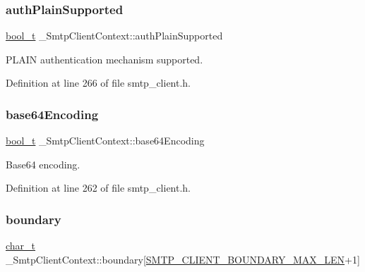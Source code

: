 \subsubsection{\texorpdfstring{auth\+Plain\+Supported}{authPlainSupported}}
{\footnotesize\ttfamily \hyperlink{compiler__port_8h_a812d16e5494522586b3784e55d479912}{bool\+\_\+t} \+\_\+\+Smtp\+Client\+Context\+::auth\+Plain\+Supported}



P\+L\+A\+IN authentication mechanism supported. 



Definition at line 266 of file smtp\+\_\+client.\+h.

\mbox{\label{struct__SmtpClientContext_a7805b71cff07e84b4592a21cfc830ac7}} 
\subsubsection{\texorpdfstring{base64\+Encoding}{base64Encoding}}
{\footnotesize\ttfamily \hyperlink{compiler__port_8h_a812d16e5494522586b3784e55d479912}{bool\+\_\+t} \+\_\+\+Smtp\+Client\+Context\+::base64\+Encoding}



Base64 encoding. 



Definition at line 262 of file smtp\+\_\+client.\+h.

\mbox{\label{struct__SmtpClientContext_ac5d4f45c1fbfc6f882f0d1bd99f5faa0}} 
\subsubsection{\texorpdfstring{boundary}{boundary}}
{\footnotesize\ttfamily \hyperlink{compiler__port_8h_a40bb5262bf908c328fbcfbe5d29d0201}{char\+\_\+t} \+\_\+\+Smtp\+Client\+Context\+::boundary\mbox{[}\hyperlink{smtp__client_8h_adea07fb5e3cabd59c58567657e9de718}{S\+M\+T\+P\+\_\+\+C\+L\+I\+E\+N\+T\+\_\+\+B\+O\+U\+N\+D\+A\+R\+Y\+\_\+\+M\+A\+X\+\_\+\+L\+EN}+1\mbox{]}}




